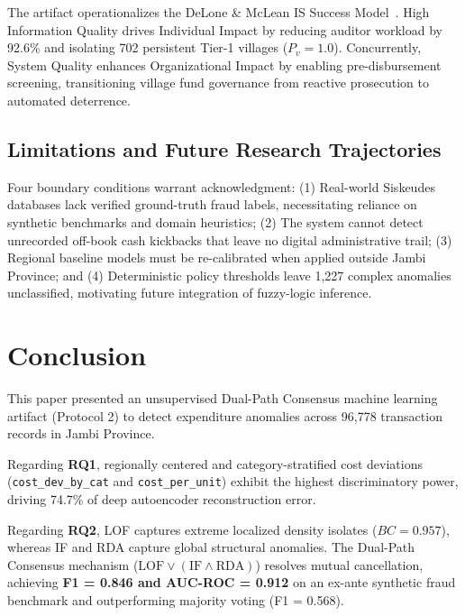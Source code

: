 \documentclass[conference]{IEEEtran}
\begin{document}
The artifact operationalizes the DeLone \& McLean IS Success Model~\cite{ref10}. High Information Quality drives Individual Impact by reducing auditor workload by 92.6\% and isolating 702 persistent Tier-1 villages ($P_v = 1.0$). Concurrently, System Quality enhances Organizational Impact by enabling pre-disbursement screening, transitioning village fund governance from reactive prosecution to automated deterrence.

\subsection{Limitations and Future Research Trajectories}

Four boundary conditions warrant acknowledgment: (1) Real-world Siskeudes databases lack verified ground-truth fraud labels, necessitating reliance on synthetic benchmarks and domain heuristics; (2) The system cannot detect unrecorded off-book cash kickbacks that leave no digital administrative trail; (3) Regional baseline models must be re-calibrated when applied outside Jambi Province; and (4) Deterministic policy thresholds leave 1,227 complex anomalies unclassified, motivating future integration of fuzzy-logic inference.

\section{Conclusion}

This paper presented an unsupervised Dual-Path Consensus machine learning artifact (Protocol 2) to detect expenditure anomalies across 96,778 transaction records in Jambi Province.

Regarding \textbf{RQ1}, regionally centered and category-stratified cost deviations (\texttt{cost\_dev\_by\_cat} and \texttt{cost\_per\_unit}) exhibit the highest discriminatory power, driving 74.7\% of deep autoencoder reconstruction error.

Regarding \textbf{RQ2}, LOF captures extreme localized density isolates ($BC = 0.957$), whereas IF and RDA capture global structural anomalies. The Dual-Path Consensus mechanism ($\text{LOF} \lor (\text{IF} \land \text{RDA})$) resolves mutual cancellation, achieving \textbf{F1 = 0.846 and AUC-ROC = 0.912} on an ex-ante synthetic fraud benchmark and outperforming majority voting (F1 = 0.568).
\end{document}
